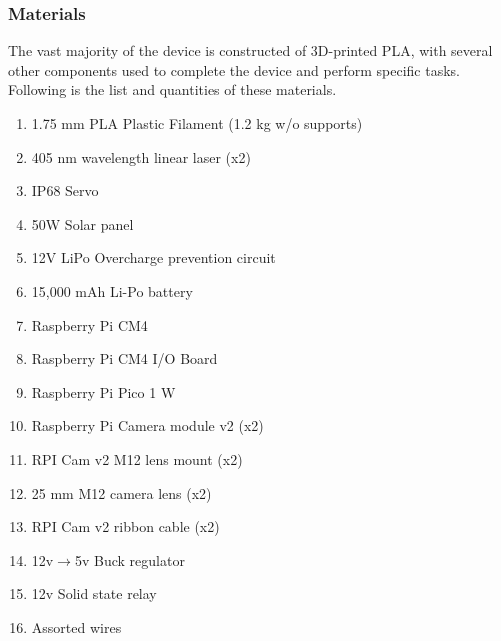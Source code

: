 \documentclass[fleqn,10pt]{SelfArx} %
\begin{document}
\begin{enumerate}
		
		
	\end{enumerate}
	\subsubsection{Materials}
	The vast majority of the device is constructed of 3D-printed PLA, with several other components used to complete the device and perform specific tasks. Following is the list and quantities of these materials.
	
	\begin{enumerate}
		
		\item 1.75 mm PLA Plastic Filament (1.2 kg w/o supports)
		\item 405 nm wavelength linear laser (x2)
		\item IP68 Servo
		\item 50W Solar panel
		\item 12V LiPo Overcharge prevention circuit
		\item 15,000 mAh Li-Po battery
		\item Raspberry Pi CM4
		\item Raspberry Pi CM4 I/O Board
		\item Raspberry Pi Pico 1 W
		\item Raspberry Pi Camera module v2 (x2)
		\item \gls{RPI} Cam v2 M12 lens mount (x2)
		\item 25 mm M12 camera lens (x2)
		\item \gls{RPI} Cam v2 ribbon cable (x2)
		\item 12v$\rightarrow$5v Buck regulator
		\item 12v Solid state relay
		\item Assorted wires
		
	\end{enumerate}
	
\end{document}
